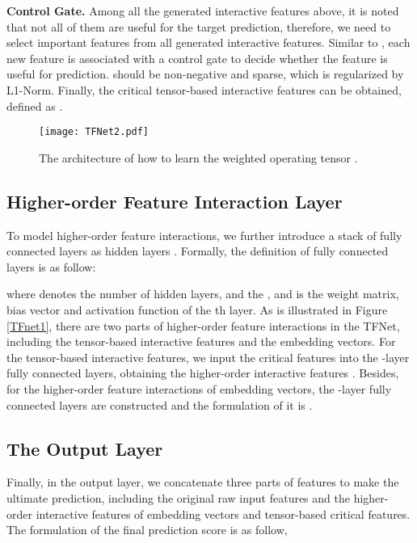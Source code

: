 \documentclass[sigconf]{acmart}
\begin{document}
\textbf{Control Gate.}  Among all the generated interactive features above, it is noted that not all of them are useful for the target prediction, therefore, we need to select important features from all generated interactive features. Similar to \cite{wang2018interpret}, each new feature is associated with a control gate  to decide whether the feature is useful for prediction.  should be non-negative and sparse, which is regularized by L1-Norm. Finally, the critical tensor-based interactive features can be obtained, defined as .  

\begin{figure}
\setlength{\abovecaptionskip}{0pt}  \setlength{\belowcaptionskip}{0pt}  \centering
\texttt{[image: TFNet2.pdf]}
\caption{The architecture of how to learn the weighted operating tensor .}
\label{TFNet2}
\end{figure}




\subsection{Higher-order Feature Interaction Layer}
To model higher-order feature interactions, we further introduce a stack of fully connected layers as hidden layers . Formally, the definition of fully connected layers is as follow:


\noindent where  denotes the number of hidden layers, and the ,  and  is the weight matrix, bias vector and activation function of the th layer. 
As is illustrated in Figure \ref{TFnet1}, there are two parts of higher-order feature interactions in the TFNet, including the tensor-based interactive features and the embedding vectors. 
For the tensor-based interactive features, we input the critical features  into the -layer fully connected layers, obtaining the higher-order interactive features . Besides, for the higher-order feature interactions of embedding vectors, the -layer fully connected layers are constructed and the formulation of it is .


\subsection{The Output Layer}
Finally, in the output layer, we concatenate three parts of features to make the ultimate prediction, including the original raw input features and the higher-order interactive features of embedding vectors and tensor-based critical features. The formulation of the final prediction score is as follow,
\end{document}
